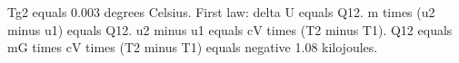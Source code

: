 Tg2 equals 0.003 degrees Celsius.  
First law: delta U equals Q12.  
m times (u2 minus u1) equals Q12.  
u2 minus u1 equals cV times (T2 minus T1).  
Q12 equals mG times cV times (T2 minus T1) equals negative 1.08 kilojoules.
